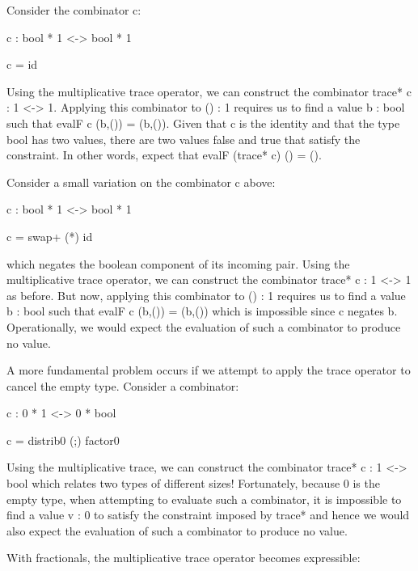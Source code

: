 \documentclass{llncs}
\begin{document}
\begin{example}
Consider the combinator {{c}}:

{{c : bool * 1 <-> bool * 1}} 

{{c = id}}

\noindent Using the multiplicative trace operator, we can construct the
combinator {{trace* c : 1 <-> 1}}. Applying this combinator to 
{{() : 1}} requires us to find a value {{b : bool}} such that 
{{evalF c (b,()) = (b,())}}. Given that {{c}} is the identity and that the type {{bool}} 
has two values, there are two values {{false}} and {{true}} that satisfy the 
constraint. In other words, expect that {{evalF (trace* c) () = ()}}. 
\end{example}

\begin{example}
\label{ch3:ex:annihilate}
Consider a small variation on the combinator {{c}} above:

{{c : bool * 1 <-> bool * 1}} 

{{c = swap+ (*) id }}

\noindent which negates the boolean component of its incoming
pair. Using the multiplicative trace operator, we can construct the
combinator {{trace* c : 1 <-> 1}} as before. But now, applying this
combinator to {{() : 1}} requires us to find a value {{b : bool}} such
that {{evalF c (b,()) = (b,())}} which is impossible since {{c}} negates
{{b}}. Operationally, we would expect the evaluation of such a
combinator to produce no value. 
\end{example}

\begin{example}
A more fundamental problem occurs if we attempt to apply the trace
operator to cancel the empty type. Consider a combinator:

{{c : 0 * 1 <-> 0 * bool}}

{{c = distrib0 (;) factor0}}

\noindent Using the multiplicative trace, we can construct the combinator
{{trace* c : 1 <-> bool}} which relates two types of different sizes! Fortunately,
because {{0}} is the empty type, 
when attempting to evaluate such a combinator, it is impossible to find a value
{{v : 0}} to satisfy the constraint imposed by {{trace*}} and hence 
we would also expect the evaluation of such a combinator to produce no value.
\end{example}

With fractionals, the multiplicative trace operator becomes expressible:
\end{document}

